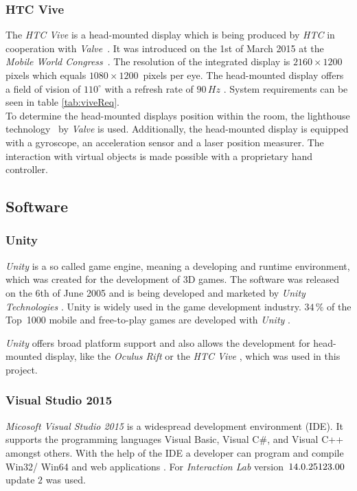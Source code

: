 \subsubsection{HTC Vive}\label{sec:Vive} 
The \textit{HTC Vive} is a head-mounted display which is being produced by \textit{HTC} in cooperation with \textit{Valve}~\cite{website:Valve}. It was introduced on the 1st of March 2015 at the \textit{Mobile World Congress}~\cite{website:mobileworldcongress}. The resolution of the integrated display is $2160\times1200$\,pixels which equals $1080\times1200$\, pixels per eye. The head-mounted display offers a field of vision of $110^\circ$ with a refresh rate of $90\,Hz$ \cite{website:HTC_Vive}. System requirements can be seen in table \ref{tab:viveReq}. \\ 

To determine the head-mounted displays position within the room, the lighthouse technology~\cite{website:Lighthouses} by \textit{Valve} is used. Additionally, the head-mounted display is equipped with a gyroscope, an acceleration sensor and a laser position measurer. The interaction with virtual objects is made possible with a proprietary hand controller. 
	
\subsection{Software}
	
\subsubsection{Unity}\label{sec:unity}
\textit{Unity} is a so called game engine, meaning a developing and runtime environment, which was created for the development of 3D games. The software was released on the 6th of June 2005 \cite{haas2014histor} and is being developed and marketed by \textit{Unity Technologies} \cite{website:Unity}. Unity is widely used in the game development industry. $34\,\%$ of the Top~1000 mobile and free-to-play games are developed with \textit{Unity} \cite{website:UnityPR}. 

\textit{Unity} offers broad platform support \cite{website:UnityMultiPlatform} and also allows the development for head-mounted display, like the \textit{Oculus Rift} \cite{website:UnityVRoverview} or the \textit{HTC Vive} \cite{website:UnityVRoverview}, which was used in this project.
	
\subsubsection{Visual Studio 2015}\label{sec:VisualStudio}
\textit{Micosoft Visual Studio 2015} is a widespread development environment (IDE). It supports the programming languages Visual Basic, Visual C$\#$, and Visual C++ amongst others. With the help of the IDE a developer can program and compile Win32/ Win64 and web applications \cite{VisuStud}. For \textit{Interaction Lab} version~$14.0.\-25123.00$ update $2$ was used.

